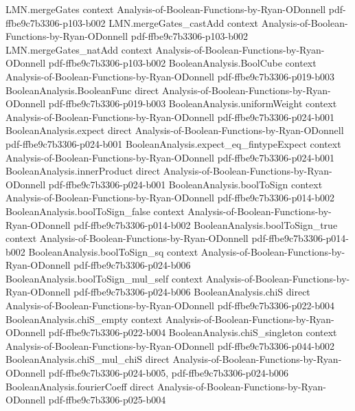 \begin{lemma}
\proofstep
  {LMN.mergeGates}
  {context}
  {Analysis-of-Boolean-Functions-by-Ryan-ODonnell}
  {pdf-ffbe9c7b3306-p103-b002}
\proofstep
  {LMN.mergeGates_castAdd}
  {context}
  {Analysis-of-Boolean-Functions-by-Ryan-ODonnell}
  {pdf-ffbe9c7b3306-p103-b002}
\proofstep
  {LMN.mergeGates_natAdd}
  {context}
  {Analysis-of-Boolean-Functions-by-Ryan-ODonnell}
  {pdf-ffbe9c7b3306-p103-b002}
\proofstep
  {BooleanAnalysis.BoolCube}
  {context}
  {Analysis-of-Boolean-Functions-by-Ryan-ODonnell}
  {pdf-ffbe9c7b3306-p019-b003}
\proofstep
  {BooleanAnalysis.BooleanFunc}
  {direct}
  {Analysis-of-Boolean-Functions-by-Ryan-ODonnell}
  {pdf-ffbe9c7b3306-p019-b003}
\proofstep
  {BooleanAnalysis.uniformWeight}
  {context}
  {Analysis-of-Boolean-Functions-by-Ryan-ODonnell}
  {pdf-ffbe9c7b3306-p024-b001}
\proofstep
  {BooleanAnalysis.expect}
  {direct}
  {Analysis-of-Boolean-Functions-by-Ryan-ODonnell}
  {pdf-ffbe9c7b3306-p024-b001}
\proofstep
  {BooleanAnalysis.expect_eq_fintypeExpect}
  {context}
  {Analysis-of-Boolean-Functions-by-Ryan-ODonnell}
  {pdf-ffbe9c7b3306-p024-b001}
\proofstep
  {BooleanAnalysis.innerProduct}
  {direct}
  {Analysis-of-Boolean-Functions-by-Ryan-ODonnell}
  {pdf-ffbe9c7b3306-p024-b001}
\proofstep
  {BooleanAnalysis.boolToSign}
  {context}
  {Analysis-of-Boolean-Functions-by-Ryan-ODonnell}
  {pdf-ffbe9c7b3306-p014-b002}
\proofstep
  {BooleanAnalysis.boolToSign_false}
  {context}
  {Analysis-of-Boolean-Functions-by-Ryan-ODonnell}
  {pdf-ffbe9c7b3306-p014-b002}
\proofstep
  {BooleanAnalysis.boolToSign_true}
  {context}
  {Analysis-of-Boolean-Functions-by-Ryan-ODonnell}
  {pdf-ffbe9c7b3306-p014-b002}
\proofstep
  {BooleanAnalysis.boolToSign_sq}
  {context}
  {Analysis-of-Boolean-Functions-by-Ryan-ODonnell}
  {pdf-ffbe9c7b3306-p024-b006}
\proofstep
  {BooleanAnalysis.boolToSign_mul_self}
  {context}
  {Analysis-of-Boolean-Functions-by-Ryan-ODonnell}
  {pdf-ffbe9c7b3306-p024-b006}
\proofstep
  {BooleanAnalysis.chiS}
  {direct}
  {Analysis-of-Boolean-Functions-by-Ryan-ODonnell}
  {pdf-ffbe9c7b3306-p022-b004}
\proofstep
  {BooleanAnalysis.chiS_empty}
  {context}
  {Analysis-of-Boolean-Functions-by-Ryan-ODonnell}
  {pdf-ffbe9c7b3306-p022-b004}
\proofstep
  {BooleanAnalysis.chiS_singleton}
  {context}
  {Analysis-of-Boolean-Functions-by-Ryan-ODonnell}
  {pdf-ffbe9c7b3306-p044-b002}
\proofstep
  {BooleanAnalysis.chiS_mul_chiS}
  {direct}
  {Analysis-of-Boolean-Functions-by-Ryan-ODonnell}
  {pdf-ffbe9c7b3306-p024-b005,
    pdf-ffbe9c7b3306-p024-b006}
\proofstep
  {BooleanAnalysis.fourierCoeff}
  {direct}
  {Analysis-of-Boolean-Functions-by-Ryan-ODonnell}
  {pdf-ffbe9c7b3306-p025-b004}

\end{lemma}
